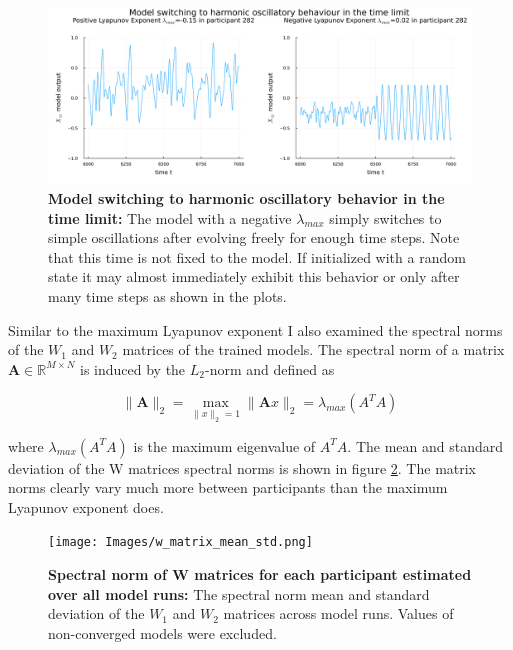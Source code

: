 \begin{figure}
    \includegraphics[width=\textwidth]{Images/oscillator_neg_le.png}
    \caption[Model switching to harmonic oscillatory behavior in the time limit]
    {\textbf{Model switching to harmonic oscillatory behavior in the time limit: } The model with a negative $\lambda_{max}$ simply switches to simple oscillations 
    after evolving freely for enough time steps. Note that this time is not fixed to the model. If initialized with a random state it may almost immediately exhibit this 
    behavior or only after many time steps as shown in the plots.}
    \label{fig:oscillator_neg_le}
\end{figure}

Similar to the maximum Lyapunov exponent I also examined the spectral norms of the $W_1$ and $W_2$ matrices of the trained models. The spectral norm of a matrix 
$\boldsymbol{A} \in \mathbb{R}^{M \times N}$ is induced by the $L_2$-norm and defined as 

\begin{equation}
    \| \boldsymbol{A} \|_2 = \max_{\|x\|_2=1} \|\boldsymbol{A} x \|_2 = \lambda_{max}(A^T A)
    \label{eq:spec_norm_def}
\end{equation}

where $\lambda_{max}(A^T A)$ is the maximum eigenvalue of $A^T A$. The mean and standard deviation of the W matrices spectral norms is shown in
figure \ref{fig:w_matrix_mean_std}. The matrix norms clearly vary much more between participants than the maximum Lyapunov exponent does. 

\begin{figure}
    \texttt{[image: Images/w\_matrix\_mean\_std.png]}
    \caption[Spectral norm of W matrices for each participant estimated over all model runs]
    {\textbf{Spectral norm of W matrices for each participant estimated over all model runs: } The spectral norm mean and standard deviation of the $W_1$ and $W_2$ matrices
    across model runs. Values of non-converged models were excluded.}
    \label{fig:w_matrix_mean_std}
\end{figure}


